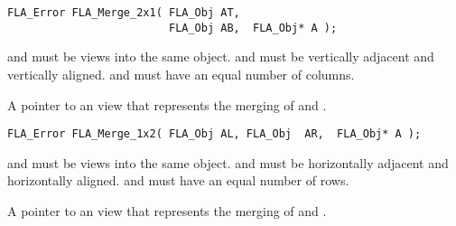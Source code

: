 
\begin{flaspec}
\begin{verbatim}
FLA_Error FLA_Merge_2x1( FLA_Obj AT,
                         FLA_Obj AB,  FLA_Obj* A );
\end{verbatim}
\begin{checks}
\checkitem
\AT and \AB must be views into the same object.
\itemvsp
\checkitem
\AT and \AB must be vertically adjacent and vertically aligned.
\itemvsp
\checkitem
\AT and \AB must have an equal number of columns.
\end{checks}
\rvalue{
\flasuccess
}
\begin{params}
                       {A pointer to an \flaobj view that represents the
                        merging of \AL and \ARns.}
\end{params}
\end{flaspec}


\begin{flaspec}
\begin{verbatim}
FLA_Error FLA_Merge_1x2( FLA_Obj AL, FLA_Obj  AR,  FLA_Obj* A );
\end{verbatim}
\begin{checks}
\checkitem
\AL and \AR must be views into the same object.
\itemvsp
\checkitem
\AL and \AR must be horizontally adjacent and horizontally aligned.
\itemvsp
\checkitem
\AL and \AR must have an equal number of rows.
\end{checks}
\rvalue{
\flasuccess
}
\begin{params}
                       {A pointer to an \flaobj view that represents the
                        merging of \AT and \ABns.}
\end{params}
\end{flaspec}

